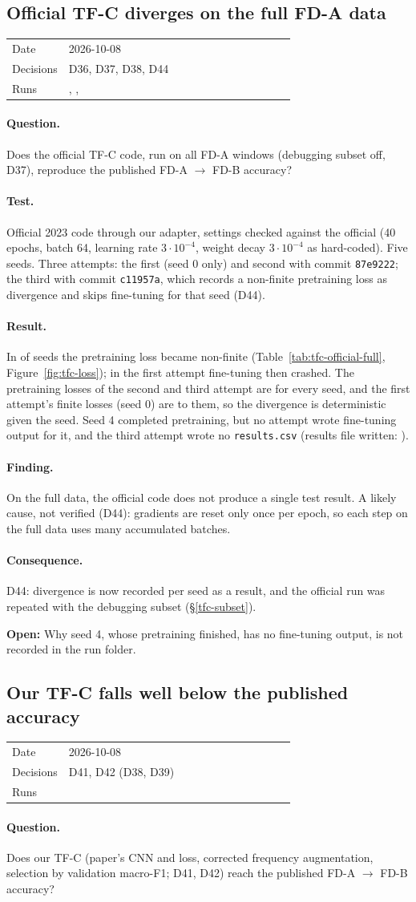 \documentclass[11pt,a4paper]{article}
\makeatletter
\newcommand{\entry}[5]{%
  \subsection{#2}\label{#1}
  \begin{tabular}{@{}>{\footnotesize\color{muted}}l>{\footnotesize}p{0.8\linewidth}@{}}
    Date & #3 \\ Decisions & #4 \\ Runs & #5
  \end{tabular}\par}
\newcommand{\question}{\paragraph{Question.}}
\newcommand{\test}{\paragraph{Test.}}
\newcommand{\result}{\paragraph{Result.}}
\newcommand{\finding}{\paragraph{Finding.}}
\newcommand{\consequence}{\paragraph{Consequence.}}
\newcommand{\openpoint}[1]{\par\textcolor{openpt}{\textbf{Open:}} #1\par}
\newcommand{\run}[1]{\texttt{\detokenize{#1}}}
\newcommand{\sref}[1]{\S\ref{#1}}
\makeatother
\begin{document}
\entry{tfc-full}{Official TF-C diverges on the full FD-A data}{2026-10-08}
  {D36, D37, D38, D44}{\run{20261008_134951_tfc_official_fd}, \run{20261008_143021_tfc_official_fd},
  \run{20261008_155516_tfc_official_fd}}

\question
Does the official TF-C code, run on all FD-A windows (debugging subset off, D37),
reproduce the published FD-A $\to$ FD-B accuracy?

\test
Official 2023 code through our adapter, settings checked against the official
 (40 epochs, batch 64, learning rate $3\cdot10^{-4}$, weight decay
$3\cdot10^{-4}$ as hard-coded). Five seeds. Three attempts: the first (seed 0 only) and second
with commit \texttt{87e9222}; the third with commit \texttt{c11957a}, which records a
non-finite pretraining loss as divergence and skips fine-tuning for that seed (D44).

\result
In \TfcFullDiverged{} of \TfcFullSeeds{} seeds the pretraining loss became non-finite
(Table~\ref{tab:tfc-official-full}, Figure~\ref{fig:tfc-loss}); in the first attempt
fine-tuning then crashed. The pretraining losses of the second and third attempt are
\TfcFullIdentical{} for every seed, and the first attempt's finite losses (seed 0) are
\TfcFullFirstIdentical{} to them, so the divergence is deterministic given the seed. Seed 4
completed pretraining, but no attempt wrote fine-tuning output for it, and the third
attempt wrote no \texttt{results.csv} (results file written: \TfcFullResultsWritten).

\finding
On the full data, the official code does not produce a single test result. A likely
cause, not verified (D44): gradients are reset only once per epoch, so each step on the
full data uses many accumulated batches.

\consequence
D44: divergence is now recorded per seed as a result, and the official run was repeated
with the debugging subset (\sref{tfc-subset}).

\openpoint{Why seed 4, whose pretraining finished, has no fine-tuning output, is not
recorded in the run folder.}



\entry{tfc-ours}{Our TF-C falls well below the published accuracy}{2026-10-08}
  {D41, D42 (D38, D39)}{\run{20261008_142751_tfc_fd}}

\question
Does our TF-C (paper's CNN and loss, corrected frequency augmentation, selection by
validation macro-F1; D41, D42) reach the published FD-A $\to$ FD-B accuracy?
\end{document}
